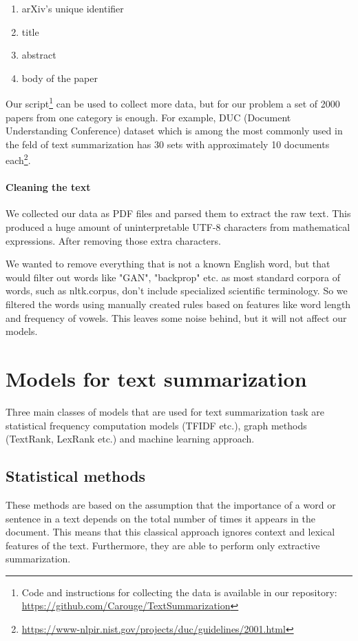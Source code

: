 \documentclass[sigplan]{acmart}
\begin{document}
\begin{enumerate}
  \item arXiv's unique identifier
  \item title
  \item abstract
  \item body of the paper
\end{enumerate}

Our script\footnote{Code and instructions for collecting the data is available in our repository: \url{https://github.com/Carouge/TextSummarization}} can be used to collect more data, but for our problem a set of 2000 papers from one category is enough. For example, DUC (Document Understanding Conference) dataset which is among the most commonly used in the feld of text summarization has 30 sets with approximately 10 documents each\footnote{\url{https://www-nlpir.nist.gov/projects/duc/guidelines/2001.html}}.

\paragraph{Cleaning the text} We collected our data as PDF files and parsed them to extract the raw text. This produced a huge amount of uninterpretable UTF-8 characters from mathematical expressions. After removing those extra characters.

We wanted to remove everything that is not a known English word, but that would filter out words like "GAN", "backprop" etc. as most standard corpora of words, such as nltk.corpus, don't include specialized scientific terminology. So we filtered the words using manually created rules based on features like word length and frequency of vowels. This leaves some noise behind, but it will not affect our models.

\section{Models for text summarization}

Three main classes of models that are used for text summarization task are statistical frequency computation models (TFIDF etc.), graph methods (TextRank, LexRank etc.) and machine learning approach.

\subsection{Statistical methods}

These methods are based on the assumption that the importance of a word or sentence in a text depends on the total number of times it appears in the document. This means that this classical approach ignores context and lexical features of the text. Furthermore, they are able to perform only extractive summarization.
\end{document}
